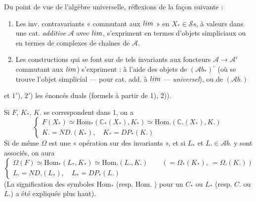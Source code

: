 \documentclass[11pt,a4paper]{article}
\begin{document}
Du point de vue de l'algèbre universelle, 
 réflexions de la façon suivante :
\begin{enumerate}
  \item[1.] Les inv. contravariants « commutant aux $\varprojlim$ » en $X_{*} \in \mathcal{S}s$,
  à valeurs dans une cat. \emph{additive} $\mathcal{A}$ avec $\varprojlim$, s'expriment
  en termes d'objets simpliciaux ou en termes de complexes de chaînes de $\mathcal{A}$.
  \item[2.] Les constructions qui se font sur de tels invariants  \struck{\ill{}}  aux foncteurs
  $\mathcal{A} \to \mathcal{A}'$ commutant aux $\varprojlim$) s'expriment : à l'aide des
  objets de $(\mathcal{A}b_{*})^{\circ}$ (où se trouve l'objet simplicial --- pour cat.
  add. à $\varprojlim$ --- \emph{universel}), ou de $(\mathcal{A}b.)$
\end{enumerate}
et $1'$), $2'$) les énoncés duals (formels à partir de 1), 2)).

Si $F$, $K_{*}$, $K.$ se correspondent dans 1, on a
\[
  \begin{cases}
    F(X_{*}) \simeq \mathrm{Hom}_{*}(\mathbb{C}_{*}(X_{*}), K_{*}) \simeq \mathrm{Hom}.(\mathbb{C}.(X_{*}), K.) \\
    K. = ND.(K_{*}), \quad K_{*} = DP_{*}(K.)
  \end{cases}
\]
Si de même $\Omega$ est une « opération sur des invariants », et si $L_{*}$ 
et $L. \in \mathcal{A}b.$ y sont associés, on aura
\[
  \begin{cases}
    \Omega(F) \simeq \mathrm{Hom}_{*}(L_{*}, K_{*}) \simeq \mathrm{Hom}.(L., K.)
    \qquad (= \Omega_{*}(K_{*}),\ = \Omega.(K.)) \\
    L. = ND.(L_{*}), \quad L_{*} = DP_{*}(L.)
  \end{cases}
\]
(La signification des symboles $\mathrm{Hom}_{*}$  (resp.
$\mathrm{Hom}.$ ) pour \struck{\ill{}} un $C_{*}$ ou $L_{*}$
(resp. $C.$ ou $L.$) a été expliquée plus haut).
\end{document}
